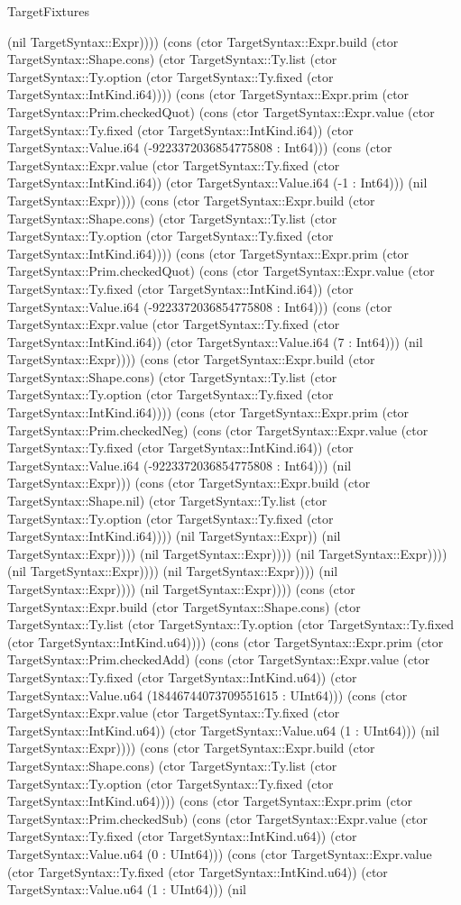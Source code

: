 \begin{lexlean}{TargetFixtures}
\begin{semanticmodule}
{(nil TargetSyntax::Expr)))) (cons (ctor TargetSyntax::Expr.build (ctor TargetSyntax::Shape.cons) (ctor TargetSyntax::Ty.list (ctor TargetSyntax::Ty.option (ctor TargetSyntax::Ty.fixed (ctor TargetSyntax::IntKind.i64)))) (cons (ctor TargetSyntax::Expr.prim (ctor TargetSyntax::Prim.checkedQuot) (cons (ctor TargetSyntax::Expr.value (ctor TargetSyntax::Ty.fixed (ctor TargetSyntax::IntKind.i64)) (ctor TargetSyntax::Value.i64 (-9223372036854775808 : Int64))) (cons (ctor TargetSyntax::Expr.value (ctor TargetSyntax::Ty.fixed (ctor TargetSyntax::IntKind.i64)) (ctor TargetSyntax::Value.i64 (-1 : Int64))) (nil TargetSyntax::Expr)))) (cons (ctor TargetSyntax::Expr.build (ctor TargetSyntax::Shape.cons) (ctor TargetSyntax::Ty.list (ctor TargetSyntax::Ty.option (ctor TargetSyntax::Ty.fixed (ctor TargetSyntax::IntKind.i64)))) (cons (ctor TargetSyntax::Expr.prim (ctor TargetSyntax::Prim.checkedQuot) (cons (ctor TargetSyntax::Expr.value (ctor TargetSyntax::Ty.fixed (ctor TargetSyntax::IntKind.i64)) (ctor TargetSyntax::Value.i64 (-9223372036854775808 : Int64))) (cons (ctor TargetSyntax::Expr.value (ctor TargetSyntax::Ty.fixed (ctor TargetSyntax::IntKind.i64)) (ctor TargetSyntax::Value.i64 (7 : Int64))) (nil TargetSyntax::Expr)))) (cons (ctor TargetSyntax::Expr.build (ctor TargetSyntax::Shape.cons) (ctor TargetSyntax::Ty.list (ctor TargetSyntax::Ty.option (ctor TargetSyntax::Ty.fixed (ctor TargetSyntax::IntKind.i64)))) (cons (ctor TargetSyntax::Expr.prim (ctor TargetSyntax::Prim.checkedNeg) (cons (ctor TargetSyntax::Expr.value (ctor TargetSyntax::Ty.fixed (ctor TargetSyntax::IntKind.i64)) (ctor TargetSyntax::Value.i64 (-9223372036854775808 : Int64))) (nil TargetSyntax::Expr))) (cons (ctor TargetSyntax::Expr.build (ctor TargetSyntax::Shape.nil) (ctor TargetSyntax::Ty.list (ctor TargetSyntax::Ty.option (ctor TargetSyntax::Ty.fixed (ctor TargetSyntax::IntKind.i64)))) (nil TargetSyntax::Expr)) (nil TargetSyntax::Expr)))) (nil TargetSyntax::Expr)))) (nil TargetSyntax::Expr)))) (nil TargetSyntax::Expr)))) (nil TargetSyntax::Expr)))) (nil TargetSyntax::Expr)))) (nil TargetSyntax::Expr)))) (cons (ctor TargetSyntax::Expr.build (ctor TargetSyntax::Shape.cons) (ctor TargetSyntax::Ty.list (ctor TargetSyntax::Ty.option (ctor TargetSyntax::Ty.fixed (ctor TargetSyntax::IntKind.u64)))) (cons (ctor TargetSyntax::Expr.prim (ctor TargetSyntax::Prim.checkedAdd) (cons (ctor TargetSyntax::Expr.value (ctor TargetSyntax::Ty.fixed (ctor TargetSyntax::IntKind.u64)) (ctor TargetSyntax::Value.u64 (18446744073709551615 : UInt64))) (cons (ctor TargetSyntax::Expr.value (ctor TargetSyntax::Ty.fixed (ctor TargetSyntax::IntKind.u64)) (ctor TargetSyntax::Value.u64 (1 : UInt64))) (nil TargetSyntax::Expr)))) (cons (ctor TargetSyntax::Expr.build (ctor TargetSyntax::Shape.cons) (ctor TargetSyntax::Ty.list (ctor TargetSyntax::Ty.option (ctor TargetSyntax::Ty.fixed (ctor TargetSyntax::IntKind.u64)))) (cons (ctor TargetSyntax::Expr.prim (ctor TargetSyntax::Prim.checkedSub) (cons (ctor TargetSyntax::Expr.value (ctor TargetSyntax::Ty.fixed (ctor TargetSyntax::IntKind.u64)) (ctor TargetSyntax::Value.u64 (0 : UInt64))) (cons (ctor TargetSyntax::Expr.value (ctor TargetSyntax::Ty.fixed (ctor TargetSyntax::IntKind.u64)) (ctor TargetSyntax::Value.u64 (1 : UInt64))) (nil }
\end{semanticmodule}
\end{lexlean}
